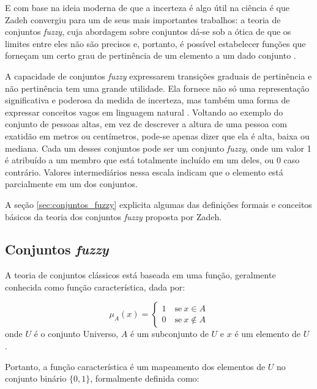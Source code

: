 E com base na ideia moderna de que a incerteza é algo útil na ciência é que Zadeh convergiu para um de seus mais importantes trabalhos: a teoria de conjuntos \emph{fuzzy}, cuja abordagem sobre conjuntos dá-se sob a ótica de que os limites entre eles não são precisos e, portanto, é possível estabelecer funções que forneçam um certo grau de pertinência de um elemento a um dado conjunto \citep{zadeh:65}.

A capacidade de conjuntos \emph{fuzzy} expressarem transições graduais de pertinência e não pertinência tem uma grande utilidade. Ela fornece não só uma representação significativa e poderosa da medida de incerteza, mas também uma forma de expressar conceitos vagos em linguagem natural \citep{klir:95}. Voltando ao exemplo do conjunto de pessoas altas, em vez de descrever a altura de uma pessoa com exatidão em metros ou centímetros, pode-se apenas dizer que ela é alta, baixa ou mediana. Cada um desses conjuntos pode ser um conjunto \emph{fuzzy}, onde um valor 1 é atribuído a um membro que está totalmente incluído em um deles, ou 0 caso contrário. Valores intermediários nessa escala indicam que o elemento está parcialmente em um dos conjuntos.

A seção \ref{sec:conjuntos_fuzzy} explicita algumas das definições formais e conceitos básicos da teoria dos conjuntos \emph{fuzzy} proposta por Zadeh.

\subsection{Conjuntos \emph{fuzzy}}
\label{sec:conjuntos_fuzzy}
A teoria de conjuntos clássicos está baseada em uma função, geralmente conhecida como função característica, dada por:

\begin{equation}
  \mu_A(x) =  \begin{cases}
                1 \quad \text{se}\ x \in A \\
                0 \quad \text{se}\ x \notin A
              \end{cases}
\end{equation}
onde $U$ é o conjunto Universo, $A$ é um subconjunto de $U$ e $x$ é um elemento de $U$ \citep{klir:95}.

Portanto, a função característica é um mapeamento dos elementos de $U$ no conjunto binário $\{0, 1\}$, formalmente definida como:

